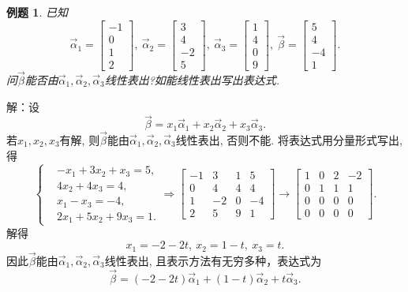 \documentclass[a4paper]{book}
\newtheorem{eg}{例题}[chapter]
\begin{document}
\begin{eg}
已知
$$\vec{\alpha}_1=\begin{bmatrix}-1\\0\\1\\2\end{bmatrix},\ \vec{\alpha}_2=\begin{bmatrix}3\\4\\-2\\5\end{bmatrix},\
\vec{\alpha}_3=\begin{bmatrix}1\\4\\0\\9\end{bmatrix},\  \vec{\beta}=\begin{bmatrix}5\\4\\-4\\1\end{bmatrix}.$$
问$\vec{\beta}$能否由$\vec{\alpha}_1,\vec{\alpha}_2,\vec{\alpha}_3$线性表出?如能线性表出写出表达式.
\end{eg}
解：设$$\vec{\beta}=x_1\vec{\alpha}_1+x_2\vec{\alpha}_2+x_3\vec{\alpha}_3.$$ 若$x_1, x_2, x_3$有解, 则$\vec{\beta}$能由$\vec{\alpha}_1,\vec{\alpha}_2,\vec{\alpha}_3$线性表出, 否则不能. 将表达式用分量形式写出, 得
\begin{displaymath}\left\{\begin{aligned}
&-x_1+3x_2+x_3=5,\\
&4x_2+4x_3=4,\\
&x_1-x_3=-4,\\
&2x_1+5x_2+9x_3=1.\end{aligned}\right.\Rightarrow\begin{bmatrix}-1&3&1&5\\0&4&4&4
\\ 1&-2&0&-4\\2&5&9&1\end{bmatrix}\rightarrow\begin{bmatrix}1&0&2&-2\\0&1&1&1\\0&0&0&0\\0&0&0&0
\end{bmatrix}.\end{displaymath}
解得$$x_1=-2-2t,\ x_2=1-t,\ x_3=t.$$
因此$\vec{\beta}$能由$\vec{\alpha}_1,\vec{\alpha}_2,\vec{\alpha}_3$线性表出, 且表示方法有无穷多种，表达式为
$$\vec{\beta}=(-2-2t)\vec{\alpha}_1+(1-t)\vec{\alpha}_2+t\vec{\alpha}_3.$$
\end{document}
